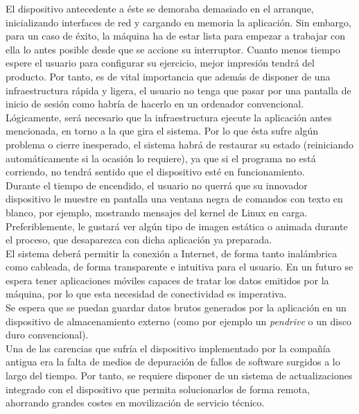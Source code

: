 El dispositivo antecedente a éste se demoraba demasiado en el arranque, inicializando interfaces de red y cargando en memoria la aplicación. Sin embargo, para un caso de éxito, la máquina ha de estar lista para empezar a trabajar con ella lo antes posible desde que se accione su interruptor. Cuanto menos tiempo espere el usuario para configurar su ejercicio, mejor impresión tendrá del producto. Por tanto, es de vital importancia que además de disponer de una infraestructura rápida y ligera, el usuario no tenga que pasar por una pantalla de inicio de sesión como habría de hacerlo en un ordenador convencional.\\

Lógicamente, será necesario que la infraestructura ejecute la aplicación antes mencionada, en torno a la que gira el sistema. Por lo que ésta sufre algún problema o cierre inesperado, el sistema habrá de restaurar su estado (reiniciando automáticamente si la ocasión lo requiere), ya que si el programa no está corriendo, no tendrá sentido que el dispositivo esté en funcionamiento.\\

Durante el tiempo de encendido, el usuario no querrá que su innovador dispositivo le muestre en pantalla una ventana negra de comandos con texto en blanco, por ejemplo, mostrando mensajes del kernel de Linux en carga. Preferiblemente, le gustará ver algún tipo de imagen estática o animada durante el proceso, que desaparezca con dicha aplicación ya preparada.\\

El sistema deberá permitir la conexión a Internet, de forma tanto inalámbrica como cableada, de forma transparente e intuitiva para el usuario. En un futuro se espera tener aplicaciones móviles capaces de tratar los datos emitidos por la máquina, por lo que esta necesidad de conectividad es imperativa.\\

Se espera que se puedan guardar datos brutos generados por la aplicación en un dispositivo de almacenamiento externo (como por ejemplo un \textit{pendrive} o un disco duro convencional).\\

Una de las carencias que sufría el dispositivo implementado por la compañía antigua era la falta de medios de depuración de fallos de software surgidos a lo largo del tiempo. Por tanto, se requiere disponer de un sistema de actualizaciones integrado con el dispositivo que permita solucionarlos de forma remota, ahorrando grandes costes en movilización de servicio técnico.\\

